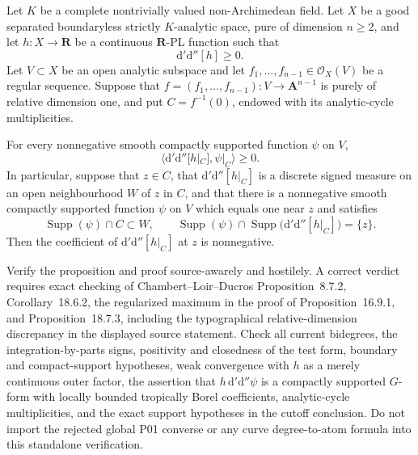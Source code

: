 \begin{proposition}
Let $K$ be a complete nontrivially valued non-Archimedean field.  Let $X$ be
a good separated boundaryless strictly $K$-analytic space, pure of dimension
$n\geq2$, and let $h:X\to\mathbf R$ be a continuous $\mathbf R$-PL
function such that
\[
                         \mathrm d'\mathrm d''[h]\geq0.
\]
Let $V\subset X$ be an open analytic subspace and let
$f_1,\ldots,f_{n-1}\in\mathcal O_X(V)$ be a regular sequence.  Suppose that
$f=(f_1,\ldots,f_{n-1}):V\to\mathbf A^{n-1}$ is purely of relative
dimension one, and put $C=f^{-1}(0)$, endowed with its analytic-cycle
multiplicities.

For every nonnegative smooth compactly supported function $\psi$ on $V$,
\[
 \bigl\langle\mathrm d'\mathrm d''[h|_C],\psi|_C\bigr\rangle\geq0.
\]
In particular, suppose that $z\in C$, that
$\mathrm d'\mathrm d''[h|_C]$ is a discrete signed measure on an open
neighbourhood $W$ of $z$ in $C$, and that there is a nonnegative smooth
compactly supported function $\psi$ on $V$ which equals one near $z$ and
satisfies
\[
 \operatorname{Supp}(\psi)\cap C\subset W,
 \qquad
 \operatorname{Supp}(\psi)\cap
 \operatorname{Supp}\bigl(\mathrm d'\mathrm d''[h|_C]\bigr)=\{z\}.
\]
Then the coefficient of $\mathrm d'\mathrm d''[h|_C]$ at $z$ is
nonnegative.
\end{proposition}

Verify the proposition and proof source-awarely and hostilely.  A correct
verdict requires exact checking of Chambert--Loir--Ducros
Proposition~8.7.2, Corollary~18.6.2, the regularized maximum in the proof of
Proposition~16.9.1, and Proposition~18.7.3, including the typographical
relative-dimension discrepancy in the displayed source statement.  Check
all current bidegrees, the integration-by-parts signs, positivity and
closedness of the test form, boundary and compact-support hypotheses, weak
convergence with $h$ as a merely continuous outer factor, the assertion that
$h\,\mathrm d'\mathrm d''\psi$ is a compactly supported $G$-form with
locally bounded tropically Borel coefficients, analytic-cycle
multiplicities, and the exact support hypotheses in the cutoff conclusion.
Do not import the rejected global P01 converse or any curve degree-to-atom
formula into this standalone verification.

